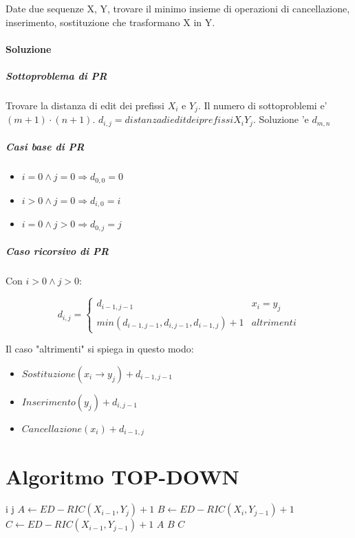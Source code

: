 Date due sequenze X, Y, trovare il minimo insieme di operazioni di cancellazione, inserimento, sostituzione che trasformano X in Y.

\paragraph{Soluzione}

\subparagraph{Sottoproblema di PR}

Trovare la distanza di edit dei prefissi $X_i$ e $Y_j$.
Il numero di sottoproblemi e' $(m+1) \cdot (n+1)$.
$d_{i,j} = distanza di edit dei prefissi X_i Y_j$.
Soluzione 'e $d_{m, n}$

\subparagraph{Casi base di PR}

\begin{itemize}
    \item $i = 0 \land j = 0 \Rightarrow d_{0,0} = 0$
    \item $i > 0 \land j = 0 \Rightarrow d_{i,0} = i$
    \item $i = 0 \land j > 0 \Rightarrow d_{0,j} = j$
\end{itemize}

\subparagraph{Caso ricorsivo di PR}

Con $i > 0 \land j > 0$:

\[
    \text{$d_{i,j}$} =
    \begin{cases}
      \text{$d_{i-1, j-1}$} & \text{$x_i = y_j$} \\
      \text{$min(d_{i-1, j-1}, d_{i, j-1}, d_{i-1, j}) + 1$} & altrimenti
    \end{cases}
\]

Il caso "altrimenti" si spiega in questo modo:
\begin{itemize}
    \item $Sostituzione(x_i \rightarrow y_j) + d_{i-1, j-1}$
    \item $Inserimento(y_j) + d_{i,j-1}$
    \item $Cancellazione(x_i) + d_{i-1, j}$
\end{itemize}

\newpage

\section{Algoritmo TOP-DOWN}

\begin{algorithm}
    \begin{algorithmic}
                \State \Return i
                \State \Return j
            \Else
                \State $A \gets ED-RIC(X_{i-1}, Y_{j}) + 1$
                \State $B \gets ED-RIC(X_{i}, Y_{j-1}) + 1$
                \State $C \gets ED-RIC(X_{i-1}, Y_{j-1}) + 1$
                    \State \Return $A$
                    \State \Return $B$
                \Else
                    \State \Return $C$
                \EndIf
            \EndIf
        \EndProcedure
    \end{algorithmic}
\end{algorithm}


